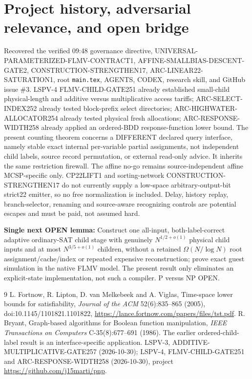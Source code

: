 \documentclass[11pt]{article}
\begin{document}
\section{Project history, adversarial relevance, and open bridge}
Recovered the verified 09:48 governance directive, UNIVERSAL-PARAMETERIZED-FLMV-CONTRACT1, AFFINE-SMALLBIAS-DESCENT-GATE2, CONSTRUCTION-STRENGTHEN17, ARC-LINEAR22-SATURATION1, root \texttt{main.tex}, AGENTS, CODEX, research skill, and GitHub issue \#3. LSPV-4 FLMV-CHILD-GATE251 already established small-child physical-length and additive versus multiplicative access tariffs; ARC-SELECT-INDEX252 already tested block-prefix select directories; ARC-HIGHWATER-ALLOCATOR254 already tested physical fresh allocations; ARC-RESPONSE-WIDTH258 already applied an ordered-BDD response-function lower bound. The present counting theorem concerns a DIFFERENT declared query interface, namely stable exact internal per-variable partial assignments, not independent child labels, source record permutation, or external read-only advice. It inherits the same restriction firewall. The affine no-go remains source-independent affine MCSP-specific only. CP22LIFT1 and sorting-network CONSTRUCTION-STRENGTHEN17 do not currently supply a low-space arbitrary-output-bit strict22 emitter, so no free normalization is included. Delay, history replay, branch-selector, renaming and source-aware recognizing controls are potential escapes and must be paid, not assumed hard.

\noindent\textbf{Single next OPEN lemma:} Construct one all-input, both-label-correct adaptive ordinary-SAT child stage with genuinely $N^{1/2+o(1)}$ physical child inputs and at most $N^{3/5+o(1)}$ children, without a retained $\Omega(N/\log N)$ root assignment/cache/index or repeated expensive reconstruction; prove exact guest simulation in the native FLMV model. The present result only eliminates an explicit-state implementation, not such a compiler. P versus NP OPEN.

\begin{thebibliography}{9}
 L. Fortnow, R. Lipton, D. van Melkebeek and A. Viglas, Time-space lower bounds for satisfiability, \emph{Journal of the ACM} 52(6):835--865 (2005), doi:10.1145/1101821.1101822, \url{https://lance.fortnow.com/papers/files/tst.pdf}.
 R. Bryant, Graph-based algorithms for Boolean function manipulation, \emph{IEEE Transactions on Computers} C-35(8):677--691 (1986). The earlier ordered-child-label result is an interface-specific application.
 LSPV-3, ADDITIVE-MULTIPLICATIVE-GATE257 (2026-10-30); LSPV-4, FLMV-CHILD-GATE251 and ARC-RESPONSE-WIDTH258 (2026-10-30), project \url{https://github.com/j15marti/pnp}.
\end{thebibliography}
\end{document}
